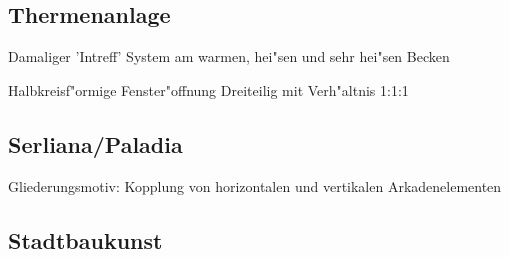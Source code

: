 \documentclass[emulatestandardclasses]{scrartcl}
\begin{document}
\subsection{Thermenanlage}

\begin{description}[leftmargin=!,labelwidth=\widthof{\bfseries Thermenfenster}]
  \item[Hintergrund] Damaliger 'Intreff' System am warmen, hei"sen und sehr hei"sen Becken
  \item[Thermenfenster] Halbkreisf"ormige Fenster"offnung Dreiteilig mit Verh"altnis 1:1:1
\end{description}

\subsection{Serliana/Paladia}

Gliederungsmotiv: Kopplung von horizontalen und vertikalen Arkadenelementen

\subsection{Stadtbaukunst}

\begin{description}[leftmargin=!,labelwidth=\widthof{\bfseries Thermenfenster}]
  \item[Hintergrund] 
  \item[] 
\end{description}




\end{document}
